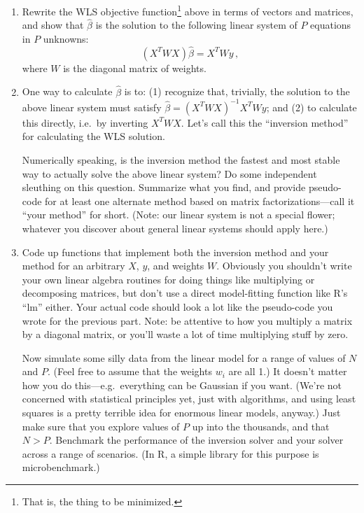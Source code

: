\documentclass{article}
\begin{document}
\begin{enumerate}

\item Rewrite the WLS objective function\footnote{That is, the thing to be minimized.} above in terms of vectors and matrices, and show that $\hat \beta$ is the solution to the following linear system of $P$ equations in $P$ unknowns:
$$
(X^T W X) \hat \beta = X^T W y \, ,
$$
where $W$ is the diagonal matrix of weights.

\item One way to calculate $\hat{\beta}$ is to: (1) recognize that, trivially, the solution to the above linear system must satisfy $\hat \beta = (X^T W X)^{-1} X^T W y$; and (2) to calculate this directly, i.e.~by inverting $X^T W X$.  Let's call this the ``inversion method'' for calculating the WLS solution.

Numerically speaking, is the inversion method the fastest and most stable way to actually solve the above linear system?  Do some independent sleuthing on this question.  Summarize what you find, and provide pseudo-code for at least one alternate method based on matrix factorizations---call it ``your method'' for short.  (Note: our linear system is not a special flower; whatever you discover about general linear systems should apply here.)

\item Code up functions that implement both the inversion method and your method for an arbitrary $X$, $y$, and weights $W$.  Obviously you shouldn't write your own linear algebra routines for doing things like multiplying or decomposing matrices, but don't use a direct model-fitting function like R's ``lm'' either.   Your actual code should look a lot like the pseudo-code you wrote for the previous part.  Note: be attentive to how you multiply a matrix by a diagonal matrix, or you'll waste a lot of time multiplying stuff by zero.

Now simulate some silly data from the linear model for a range of values of $N$ and $P$.  (Feel free to assume that the weights $w_i$ are all 1.)  It doesn't matter how you do this---e.g.~everything can be Gaussian if you want.  (We're not concerned with statistical principles yet, just with algorithms, and using least squares is a pretty terrible idea for enormous linear models, anyway.)  Just make sure that you explore values of $P$ up into the thousands, and that $N > P$.  Benchmark the performance of the inversion solver and your solver across a range of scenarios.  (In R, a simple library for this purpose is microbenchmark.)


\end{enumerate}
\end{document}
